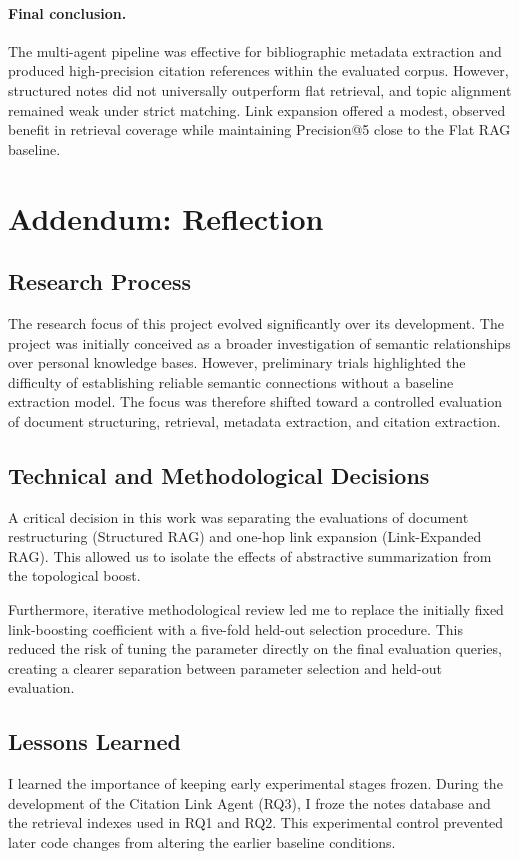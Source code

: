\documentclass[runningheads]{llncs}
\begin{document}
\paragraph{Final conclusion.}
The multi-agent pipeline was effective for bibliographic metadata extraction and produced high-precision citation references within the evaluated corpus. However, structured notes did not universally outperform flat retrieval, and topic alignment remained weak under strict matching. Link expansion offered a modest, observed benefit in retrieval coverage while maintaining Precision@5 close to the Flat RAG baseline.

\section*{Addendum: Reflection}
\label{sec:reflection}

\subsection*{Research Process}
The research focus of this project evolved significantly over its development. The project was initially conceived as a broader investigation of semantic relationships over personal knowledge bases. However, preliminary trials highlighted the difficulty of establishing reliable semantic connections without a baseline extraction model. The focus was therefore shifted toward a controlled evaluation of document structuring, retrieval, metadata extraction, and citation extraction.

\subsection*{Technical and Methodological Decisions}
A critical decision in this work was separating the evaluations of document restructuring (Structured RAG) and one-hop link expansion (Link-Expanded RAG). This allowed us to isolate the effects of abstractive summarization from the topological boost. 

Furthermore, iterative methodological review led me to replace the initially fixed link-boosting coefficient with a five-fold held-out selection procedure. This reduced the risk of tuning the parameter directly on the final evaluation queries, creating a clearer separation between parameter selection and held-out evaluation.

\subsection*{Lessons Learned}
I learned the importance of keeping early experimental stages frozen. During the development of the Citation Link Agent (RQ3), I froze the notes database and the retrieval indexes used in RQ1 and RQ2. This experimental control prevented later code changes from altering the earlier baseline conditions. 
\end{document}
